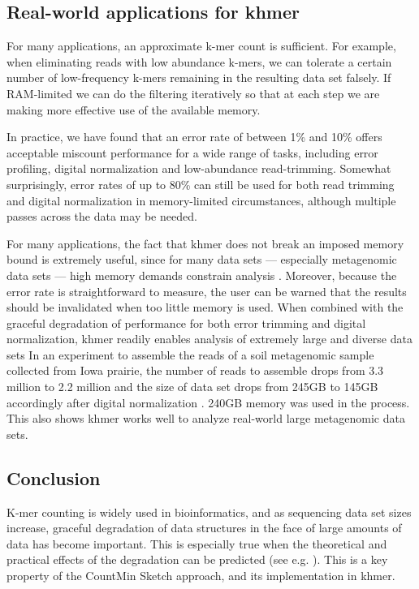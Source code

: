 \documentclass[10pt]{article}
\begin{document}
\subsection*{Real-world applications for khmer}

For many applications, an approximate k-mer count is sufficient.  For
example, when eliminating reads with low abundance k-mers, we
can tolerate a certain number of low-frequency k-mers remaining in
the resulting data set falsely.  If RAM-limited we can do the
filtering iteratively so that at each step we are making more
effective use of the available memory.

In practice, we have found that an error rate of between 1\%
and 10\% offers acceptable miscount performance for a wide range of
tasks, including error profiling, digital normalization and
low-abundance read-trimming.  Somewhat surprisingly, error
rates of up to 80\% can still be used for both read trimming and
digital normalization in memory-limited circumstances, although
multiple passes across the data may be needed.

For many applications, the fact that khmer does not break an imposed
memory bound is extremely useful, since for many data sets ---
especially metagenomic data sets --- high memory demands constrain analysis 
\cite{Howe2012,Luo2009}.  Moreover, because the error
rate is straightforward to measure, the user can be warned that the
results should be invalidated when too little memory is used.  When combined
with the graceful degradation of performance for both error trimming
and digital normalization, khmer readily enables analysis of extremely
large and diverse data sets \cite{adina2013} In an experiment to assemble 
the reads of a soil metagenomic sample collected from Iowa prairie, the number 
of reads to assemble drops from 3.3 million to 2.2 million and the size of data set
drops from 245GB to 145GB accordingly after digital normalization  \cite{Howe2012}. 
240GB memory was used in the process. This also shows khmer works well to 
analyze real-world large metagenomic data sets.

\subsection*{Conclusion}

K-mer counting is widely used in bioinformatics, and as sequencing data set sizes
increase, graceful degradation of data structures in the face of large
amounts of data has become important.  This is especially true when
the theoretical and practical effects of the degradation can be
predicted (see e.g. \cite{Melsted2011, Pell2012, Roy2013}).  This
is a key property of the CountMin Sketch
approach, and its implementation in khmer.
\end{document}
